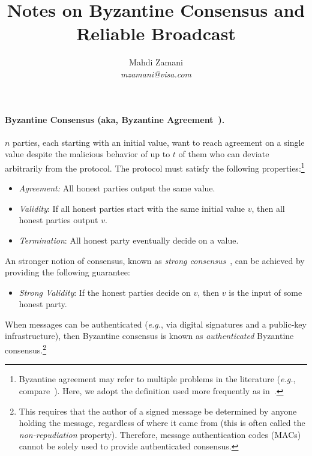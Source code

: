 \documentclass[11pt]{article}
\newcommand{\eg}{\textit{e.g.}}
\theoremstyle{mytheoremstyle}
\begin{document}
\title{Notes on Byzantine Consensus and Reliable Broadcast}

\author{Mahdi Zamani \\ \textit{mzamani@visa.com}}
\date{}

\sloppy
\maketitle

\paragraph{Byzantine Consensus (aka, Byzantine Agreement~\cite{lsp82}).} $n$ parties, each starting with an initial value, want to reach agreement on a single value despite the malicious behavior of up to $t$ of them who can deviate arbitrarily from the protocol. The protocol must satisfy the following properties:\footnote{Byzantine agreement may refer to multiple problems in the literature (\eg, compare~\cite{dffls,lindell:2002:ba}). Here, we adopt the definition used more frequently as in~\cite{lindell:2002:ba,king:2016:bae:2906142.2837019,cryptoeprint:2018:754}.}
\begin{itemize}
	\item \emph{Agreement:} All honest parties output the same value.
	\item \emph{Validity}: If all honest parties start with the same initial value $v$, then all honest parties output $v$.
	\item \emph{Termination}: All honest party eventually decide on a value.
\end{itemize}
An stronger notion of consensus, known as \emph{strong consensus}~\cite{neiger94}, can be achieved by providing the following guarantee:
\begin{itemize}
	\item \emph{Strong Validity}: If the honest parties decide on $v$, then $v$ is the input of some honest party.
\end{itemize}
When messages can be authenticated (\eg, via digital signatures and a public-key infrastructure), then Byzantine consensus is known as \emph{authenticated} Byzantine consensus.\footnote{This requires that the author of a signed message be determined by anyone holding the message, regardless of where it came from (this is often called the \emph{non-repudiation} property). Therefore, message authentication codes (MACs) cannot be solely used to provide authenticated consensus.}
\end{document}
